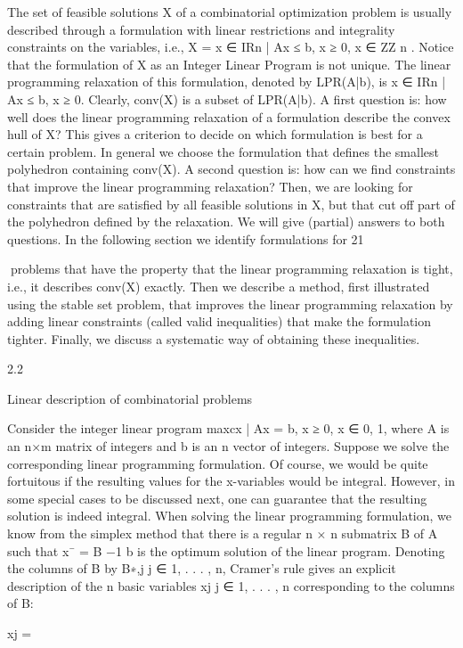 \documentclass[titlepage]{book}
\theoremstyle{definition}
\begin{document}
The set of feasible solutions X of a combinatorial optimization problem is usually described through a
formulation with linear restrictions and integrality constraints on the variables, i.e., X = {x ∈ IRn | Ax ≤
b, x ≥ 0, x ∈ ZZ n }. Notice that the formulation of X as an Integer Linear Program is not unique. The
linear programming relaxation of this formulation, denoted by LPR(A|b), is {x ∈ IRn | Ax ≤ b, x ≥ 0}.
Clearly, conv(X) is a subset of LPR(A|b). A first question is: how well does the linear programming
relaxation of a formulation describe the convex hull of X? This gives a criterion to decide on which
formulation is best for a certain problem. In general we choose the formulation that defines the smallest
polyhedron containing conv(X). A second question is: how can we find constraints that improve the
linear programming relaxation? Then, we are looking for constraints that are satisfied by all feasible
solutions in X, but that cut off part of the polyhedron defined by the relaxation.
We will give (partial) answers to both questions. In the following section we identify formulations for
21

problems that have the property that the linear programming relaxation is tight, i.e., it describes conv(X)
exactly. Then we describe a method, first illustrated using the stable set problem, that improves the linear
programming relaxation by adding linear constraints (called valid inequalities) that make the formulation
tighter. Finally, we discuss a systematic way of obtaining these inequalities.

2.2

Linear description of combinatorial problems

Consider the integer linear program
max{cx | Ax = b, x ≥ 0, x ∈ {0, 1}},
where A is an n×m matrix of integers and b is an n vector of integers. Suppose we solve the corresponding
linear programming formulation. Of course, we would be quite fortuitous if the resulting values for the
x-variables would be integral. However, in some special cases to be discussed next, one can guarantee
that the resulting solution is indeed integral.
When solving the linear programming formulation, we know from the simplex method that there is a
regular n × n submatrix B of A such that x¯ = B −1 b is the optimum solution of the linear program.
Denoting the columns of B by B∗,j j ∈ {1, . . . , n}, Cramer's rule gives an explicit description of the n
basic variables xj j ∈ {1, . . . , n} corresponding to the columns of B:

xj =
\end{document}
